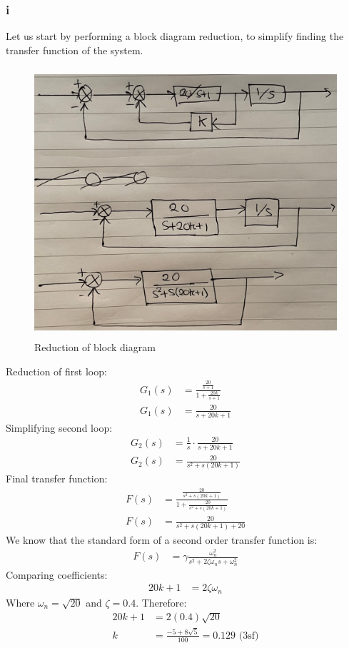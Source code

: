 \documentclass[11pt]{article}
\numberwithin{equation}{section}
\begin{document}
\subsubsection{i}
Let us start by performing a block diagram reduction, to simplify finding the transfer function of the system.
\begin{figure}[H]
    \centering
    \includegraphics[height = 10cm]{./img/q1ci.jpg}
    \caption{Reduction of block diagram}
\end{figure}
Reduction of first loop:
\begin{align}
    G_1(s) &= \frac{\frac{20}{s+1}}{1 + \frac{20k}{s+1}}\\
    G_1(s) &= \frac{20}{s + 20k +1}
\end{align}
Simplifying second loop:
\begin{align}
    G_2(s) &= \frac{1}{s}\cdot\frac{20}{s+20k+1}\\
    G_2(s) &= \frac{20}{s^2 + s(20k+1)}
\end{align}
Final transfer function:
\begin{align}
    F(s) &= \frac{\frac{20}{s^2 + s(20k+1)}}{1 + \frac{20}{s^2 + s(20k+1)}}\\
    F(s) &= \frac{20}{s^2 + s(20k+1) + 20}
\end{align}
We know that the standard form of a second order transfer function is: 
\begin{align}
    F(s) &= \gamma\frac{\omega_n^2}{s^2 + 2\zeta \omega_n s +  \omega_n^2}
\end{align}
Comparing coefficients:
\begin{align}
    20k+ 1 &= 2\zeta \omega_n
\end{align}
Where $\omega_n = \sqrt{20}$ and $\zeta = 0.4$. Therefore:
\begin{align}
    20 k + 1 &= 2 (0.4)\sqrt{20}\\
    k &= \frac{-5+8\sqrt{5}}{100} = 0.129 \textrm{ (3sf)}
\end{align}
\end{document}
